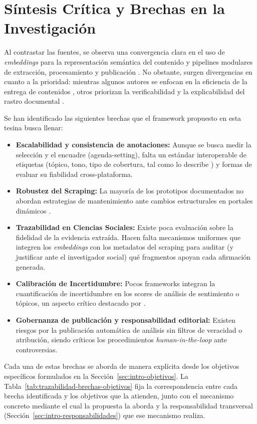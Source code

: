 \documentclass[12pt]{report}
\begin{document}
\section{Síntesis Crítica y Brechas en la Investigación}
\label{sec:rsl-brechas}
Al contrastar las fuentes, se observa una convergencia clara en el uso de \textit{embeddings} para la representación semántica del contenido y pipelines modulares de extracción, procesamiento y publicación \citep{neupane2025, behbahanian}. No obstante, surgen divergencias en cuanto a la prioridad: mientras algunos autores se enfocan en la eficiencia de la entrega de contenidos \citep{behbahanian}, otros priorizan la verificabilidad y la explicabilidad del rastro documental \citep{milbauer2023}.

Se han identificado las siguientes brechas que el framework propuesto en esta tesina busca llenar:
\begin{itemize}
  \item \textbf{Escalabilidad y consistencia de anotaciones:} Aunque se busca medir la selección y el encuadre (agenda-setting), falta un estándar interoperable de etiquetas (tópico, tono, tipo de cobertura, tal como lo describe \citet{haider2025}) y formas de evaluar su fiabilidad cross-plataforma.
  \item \textbf{Robustez del Scraping:} La mayoría de los prototipos documentados no abordan estrategias de mantenimiento ante cambios estructurales en portales dinámicos \citep{haider2025}.
  \item \textbf{Trazabilidad en Ciencias Sociales:} Existe poca evaluación sobre la fidelidad de la evidencia extraída. Hacen falta mecanismos uniformes que integren los \textit{embeddings} con los metadatos del scraping para auditar (y justificar ante el investigador social) qué fragmentos apoyan cada afirmación generada.
  \item \textbf{Calibración de Incertidumbre:} Pocos frameworks integran la cuantificación de incertidumbre en los scores de análisis de sentimiento o tópicos, un aspecto crítico destacado por \citet{pavlyshenko2024}.
  \item \textbf{Gobernanza de publicación y responsabilidad editorial:} Existen riesgos por la publicación automática de análisis sin filtros de veracidad o atribución, siendo críticos los procedimientos \textit{human-in-the-loop} ante controversias.
\end{itemize}

Cada una de estas brechas se aborda de manera explícita desde los objetivos específicos formulados en la Sección~\ref{sec:intro-objetivos}. La Tabla~\ref{tab:trazabilidad-brechas-objetivos} fija la correspondencia entre cada brecha identificada y los objetivos que la atienden, junto con el mecanismo concreto mediante el cual la propuesta la aborda y la responsabilidad transversal (Sección~\ref{sec:intro-responsabilidades}) que ese mecanismo realiza.
\end{document}
